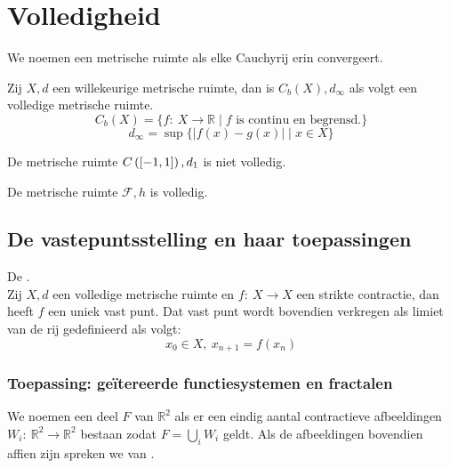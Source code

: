 \documentclass[main.tex]{subfiles}
\begin{document}
\section{Volledigheid}
\label{sec:volledigheid}

\begin{de}
  We noemen een metrische ruimte  als elke Cauchyrij erin convergeert.
\end{de}

\begin{bpr}
  Zij $X,d$ een willekeurige metrische ruimte, dan is $C_{b}(X),d_{\infty}$ als volgt een volledige metrische ruimte.
  \[ C_{b}(X) = \{ f:\ X \rightarrow \mathbb{R} \mid f \text{ is continu en begrensd.} \} \]
  \[ d_{\infty} = \sup\{ |f(x)-g(x)| \mid x \in X \} \]
\end{bpr}

\begin{bpr}
  De metrische ruimte $C\left( \interval{-1}{1} \right),d_{1}$ is niet volledig.
\end{bpr}

\begin{bpr}
  De metrische ruimte $\mathcal{F},h$ is volledig.
\end{bpr}

\subsection{De vastepuntsstelling en haar toepassingen}
\label{sec:vastepuntsstelling}

\begin{bst}
  De .\\
  Zij $X,d$ een volledige metrische ruimte en $f:\ X \rightarrow X$ een strikte contractie, dan heeft $f$ een uniek vast punt.
  Dat vast punt wordt bovendien verkregen als limiet van de rij gedefinieerd als volgt:
  \[ x_{0}\in X,\ x_{n+1} = f(x_{n}) \]
\end{bst}

\subsubsection{Toepassing: ge\"itereerde functiesystemen en fractalen}
\label{sec:toep-geit-funct}

\begin{de}
  We noemen een deel $F$ van $\mathbb{R}^{2}$  als er een eindig aantal contractieve afbeeldingen $W_{i}:\ \mathbb{R}^{2} \rightarrow \mathbb{R}^{2}$ bestaan zodat $F = \bigcup_{i}W_{i}$ geldt.
  Als de afbeeldingen bovendien affien zijn spreken we van .
\end{de}
\end{document}
